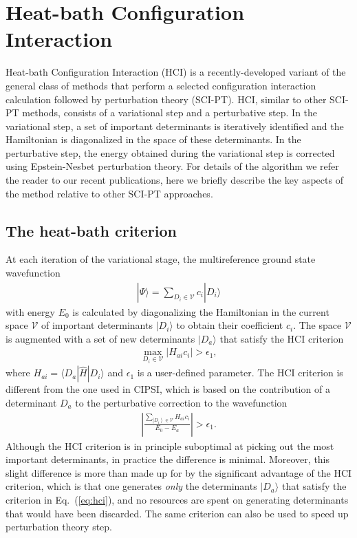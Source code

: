 \documentclass[10pt,aps,prb,twocolumn,amsmath,amssymb,superscriptaddress]{revtex4-1}
\newcommand{\ket}[1]{\left|  #1  \right\rangle}
\begin{document}
\section{Heat-bath Configuration Interaction}
Heat-bath Configuration Interaction (HCI) is a recently-developed\cite{HolTubUmr-JCTC-16} variant of the general class of methods that perform a selected configuration interaction calculation followed by perturbation theory (SCI-PT)\cite{Ivanic2001,Huron1973,Buenker1974,Evangelisti1983,Harrison1991,Steiner1994,Wenzel1996,Neese2003,Abrams2005,Bytautas2009,Knowles2015,Schriber2016,Liu2016,Caffarel2016,yann2017}. HCI, similar to other SCI-PT methods, consists of a variational step and a perturbative step. In the variational step, a set of important determinants is iteratively identified and the Hamiltonian is diagonalized in the space of these determinants. In the perturbative step, the energy obtained during the variational step is corrected using Epstein-Nesbet perturbation theory.
For details of the algorithm we refer the reader to our recent publications\cite{HolTubUmr-JCTC-16,ShaHolUmr-JCTC-17,holm17,hcicasscf}, here we briefly describe the key aspects of the method relative to other SCI-PT approaches.

\subsection{The heat-bath criterion}
At each iteration of the variational stage, the multireference ground state wavefunction
\begin{align}
    |\Psi\rangle = \sum_{D_i\in\mathcal{V}} c_i |D_i\rangle
\end{align}
with energy $E_0$ is calculated by diagonalizing the Hamiltonian in the current space $\mathcal{V}$ of important determinants $|D_i\rangle$ to obtain their coefficient $c_i$. The space $\mathcal{V}$ is augmented with a set of new determinants $|D_a\rangle$ that satisfy the HCI criterion
\begin{align}
    \max_{D_i \in \mathcal{V}} \left| H_{ai} c_i\right| > \epsilon_1, \label{eq:hci}
\end{align}
where $H_{ai}=\langle D_a|\hat{H}|D_i\rangle$ and $\epsilon_1$ is a user-defined parameter. The HCI criterion is different from the one used in CIPSI\cite{Huron1973,Evangelisti1983},
which is based on the contribution of a determinant $D_a$ to the perturbative correction to the wavefunction
\begin{align}
  \left|\frac{\sum_{\ket{D_i}\in \mathcal{V}}H_{ai}c_i }{E_0-E_a}\right| > \epsilon_1.
\end{align}
Although the HCI criterion is in principle suboptimal at picking out the most important determinants, in practice the difference is minimal.
Moreover, this slight difference is more than made up for by the significant advantage of the HCI criterion, which is that one generates \textit{only} the determinants $|D_a\rangle$ that satisfy the criterion in Eq.~(\ref{eq:hci}), and no resources are spent on generating determinants that would have been discarded.
The same criterion can also be used to speed up perturbation theory step.
\end{document}
